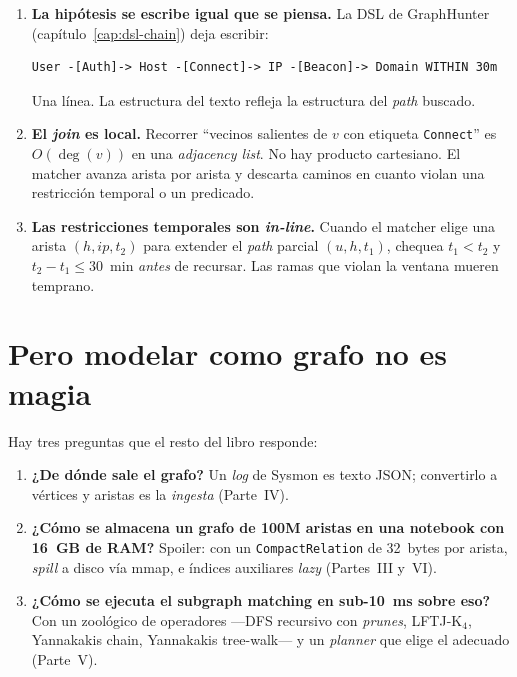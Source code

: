 \begin{enumerate}
    \item \textbf{La hipótesis se escribe igual que se piensa.} La
    DSL de GraphHunter (capítulo~\ref{cap:dsl-chain}) deja escribir:
    \begin{lstlisting}
User -[Auth]-> Host -[Connect]-> IP -[Beacon]-> Domain WITHIN 30m
    \end{lstlisting}
    Una línea. La estructura del texto refleja la estructura del
    \emph{path} buscado.

    \item \textbf{El \emph{join} es local.} Recorrer ``vecinos
    salientes de \(v\) con etiqueta \texttt{Connect}'' es \(O(\deg(v))\)
    en una \emph{adjacency list}. No hay producto cartesiano. El
    matcher avanza arista por arista y descarta caminos en cuanto
    violan una restricción temporal o un predicado.

    \item \textbf{Las restricciones temporales son \emph{in-line}.}
    Cuando el matcher elige una arista \((h, \mathit{ip}, t_2)\) para
    extender el \emph{path} parcial \((u, h, t_1)\), chequea
    \(t_1 < t_2\) y \(t_2 - t_1 \leq 30\)~min \emph{antes} de
    recursar. Las ramas que violan la ventana mueren temprano.
\end{enumerate}

\section{Pero modelar como grafo no es magia}

Hay tres preguntas que el resto del libro responde:

\begin{enumerate}
    \item \textbf{¿De dónde sale el grafo?} Un \emph{log} de Sysmon
    es texto JSON; convertirlo a vértices y aristas es la
    \emph{ingesta} (Parte~IV).
    \item \textbf{¿Cómo se almacena un grafo de 100M aristas en una
    notebook con 16~GB de RAM?} Spoiler: con un \texttt{CompactRelation}
    de 32~bytes por arista, \emph{spill} a disco vía mmap, e índices
    auxiliares \emph{lazy} (Partes~III y~VI).
    \item \textbf{¿Cómo se ejecuta el subgraph matching en sub-10~ms
    sobre eso?} Con un zoológico de operadores ---DFS recursivo con
    \emph{prunes}, LFTJ-K\(_4\), Yannakakis chain, Yannakakis
    tree-walk--- y un \emph{planner} que elige el adecuado
    (Parte~V).
\end{enumerate}

